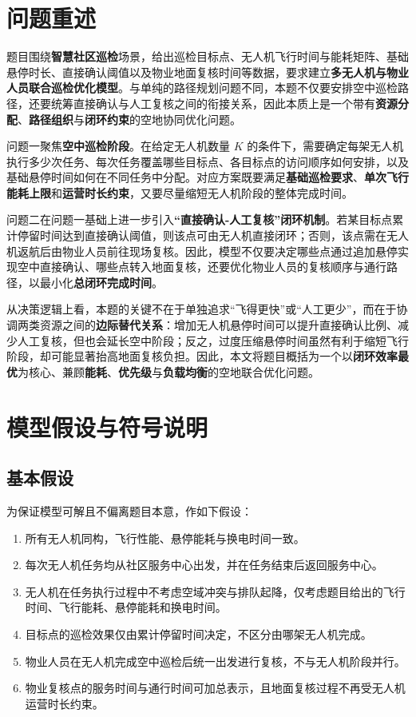 \documentclass[12pt]{article}
\begin{document}
\clearpage

\section{问题重述}
题目围绕\textbf{智慧社区巡检}场景，给出巡检目标点、无人机飞行时间与能耗矩阵、基础悬停时长、直接确认阈值以及物业地面复核时间等数据，要求建立\textbf{多无人机与物业人员联合巡检优化模型}。与单纯的路径规划问题不同，本题不仅要安排空中巡检路径，还要统筹直接确认与人工复核之间的衔接关系，因此本质上是一个带有\textbf{资源分配}、\textbf{路径组织}与\textbf{闭环约束}的空地协同优化问题。

问题一聚焦\textbf{空中巡检阶段}。在给定无人机数量 $K$ 的条件下，需要确定每架无人机执行多少次任务、每次任务覆盖哪些目标点、各目标点的访问顺序如何安排，以及基础悬停时间如何在不同任务中分配。对应方案既要满足\textbf{基础巡检要求}、\textbf{单次飞行能耗上限}和\textbf{运营时长约束}，又要尽量缩短无人机阶段的整体完成时间。

问题二在问题一基础上进一步引入\textbf{“直接确认-人工复核”闭环机制}。若某目标点累计停留时间达到直接确认阈值，则该点可由无人机直接闭环；否则，该点需在无人机返航后由物业人员前往现场复核。因此，模型不仅要决定哪些点通过追加悬停实现空中直接确认、哪些点转入地面复核，还要优化物业人员的复核顺序与通行路径，以最小化\textbf{总闭环完成时间}。

从决策逻辑上看，本题的关键不在于单独追求“飞得更快”或“人工更少”，而在于协调两类资源之间的\textbf{边际替代关系}：增加无人机悬停时间可以提升直接确认比例、减少人工复核，但也会延长空中阶段；反之，过度压缩悬停时间虽然有利于缩短飞行阶段，却可能显著抬高地面复核负担。因此，本文将题目概括为一个以\textbf{闭环效率最优}为核心、兼顾\textbf{能耗}、\textbf{优先级}与\textbf{负载均衡}的空地联合优化问题。

\section{模型假设与符号说明}

\subsection{基本假设}
为保证模型可解且不偏离题目本意，作如下假设：

\begin{enumerate}
	\item 所有无人机同构，飞行性能、悬停能耗与换电时间一致。
	\item 每次无人机任务均从社区服务中心出发，并在任务结束后返回服务中心。
	\item 无人机在任务执行过程中不考虑空域冲突与排队起降，仅考虑题目给出的飞行时间、飞行能耗、悬停能耗和换电时间。
	\item 目标点的巡检效果仅由累计停留时间决定，不区分由哪架无人机完成。
	\item 物业人员在无人机完成空中巡检后统一出发进行复核，不与无人机阶段并行。
	\item 物业复核点的服务时间与通行时间可加总表示，且地面复核过程不再受无人机运营时长约束。
\end{enumerate}
\end{document}
